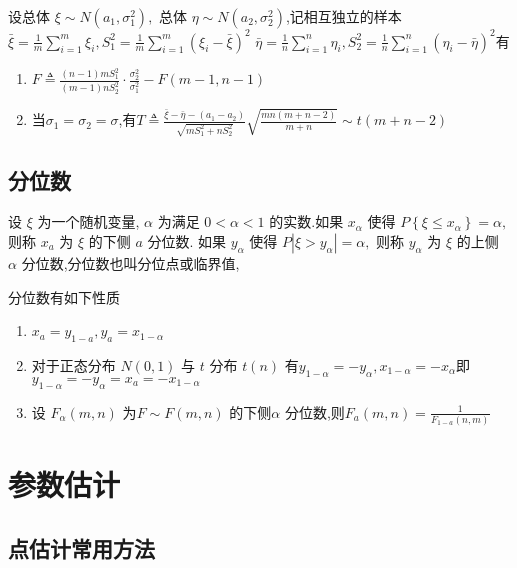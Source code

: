 \documentclass[10pt]{yerbaformat}
\begin{document}
\begin{theorem}
    设总体 $\xi \sim N\left(a_{1}, \sigma_{1}^{2}\right),$ 总体 $\eta \sim N\left(a_{2}, \sigma_{2}^{2}\right)$,记相互独立的样本$\bar{\xi}=\frac{1}{m} \sum_{i=1}^{m} \xi_{i}, S_{1}^{2}=\frac{1}{m} \sum_{i=1}^{m}\left(\xi_{i}-\bar{\xi}\right)^{2}$
    $\bar{\eta}=\frac{1}{n} \sum_{i=1}^{n} \eta_{i}, S_{2}^{2}=\frac{1}{n} \sum_{i=1}^{n}\left(\eta_{i}-\bar{\eta}\right)^{2}$有
    \begin{enumerate}
        \item $F \triangleq \frac{(n-1) m S_{1}^{2}}{(m-1) n S_{2}^{2}} \cdot \frac{\sigma_{2}^{2}}{\sigma_{1}^{2}}-F(m-1, n-1)$
        \item 当$\sigma_{1}=\sigma_{2}=\sigma$,有$T \triangleq \frac{\bar{\xi}-\bar{\eta}-\left(a_{1}-a_{2}\right)}{\sqrt{m S_{1}^{2}+n S_{2}^{2}}} \sqrt{\frac{m n(m+n-2)}{m+n}} \sim t(m+n-2)$
    \end{enumerate}
\end{theorem}


\subsection{分位数}
\begin{definition}
    设 $\xi$ 为一个随机变量, $\alpha$ 为满足 $0<\alpha<1$ 的实数.如果 $x_{\alpha}$ 使得 $P\left\{\xi \leqslant x_{\alpha}\right\}=\alpha,$ 则称 $x_{a}$ 为 $\xi$ 的下侧 $a$ 分位数. 如果 $y_{\alpha}$ 使得 $P\left|\xi>y_{\alpha}\right|=\alpha,$ 则称 $y_{\alpha}$ 为 $\xi$ 的上侧 $\alpha$ 分位数,分位数也叫分位点或临界值,
\end{definition}
\par 分位数有如下性质
\begin{enumerate}
    \item $x_{a}=y_{1-a}, y_{a}=x_{1-\alpha}$
    \item 对于正态分布 $N(0,1)$ 与 $t$ 分布 $t(n)$ 有$y_{1-\alpha}=-y_{\alpha}, x_{1-\alpha}=-x_{\alpha}
          $即$y_{1-\alpha}=-y_{\alpha}=x_{a}=-x_{1-\alpha}$
    \item 设 $F_{\alpha}(m, n)$ 为$F \sim F(m, n)$ 的下侧$\alpha$ 分位数,则$F_{a}(m, n)=\frac{1}{F_{1-a}(n, m)}$
\end{enumerate}

\section{参数估计}

\subsection{点估计常用方法}
\end{document}
